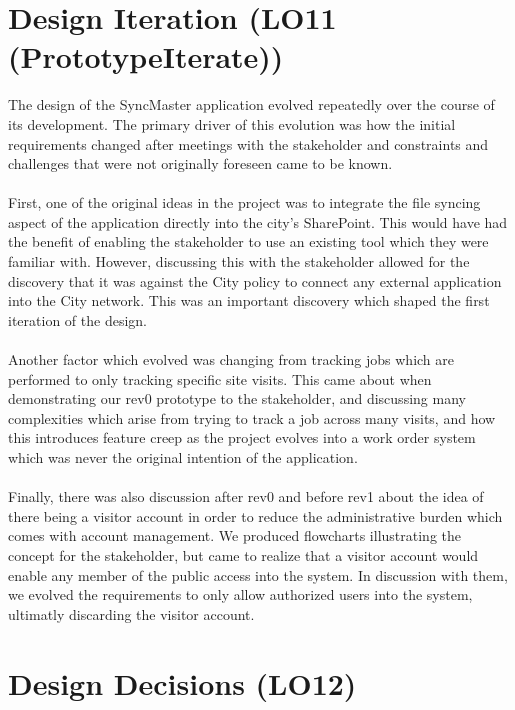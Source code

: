 \documentclass{article}
\begin{document}
\section{Design Iteration (LO11 (PrototypeIterate))}

The design of the SyncMaster application evolved repeatedly over the course of its development.
The primary driver of this evolution was how the initial requirements changed after meetings with the stakeholder
and constraints and challenges that were not originally foreseen came to be known.\\
\\
First, one of the original ideas in the project was to integrate the file syncing aspect of the application directly into the city's
SharePoint. This would have had the benefit of enabling the stakeholder to use an existing tool which they were familiar with.
However, discussing this with the stakeholder allowed for the discovery that it was against the City policy to connect any
external application into the City network. This was an important discovery which shaped the first iteration of the design.\\
\\
Another factor which evolved was changing from tracking jobs which are performed to only tracking specific site visits. This
came about when demonstrating our rev0 prototype to the stakeholder, and discussing many complexities which arise from trying
to track a job across many visits, and how this introduces feature creep as the project evolves into a work order system which
was never the original intention of the application.\\
\\
Finally, there was also discussion after rev0 and before rev1 about the idea of there being a visitor account in order to
reduce the administrative burden which comes with account management. We produced flowcharts illustrating the concept for the
stakeholder, but came to realize that a visitor account would enable any member of the public access into the system. In discussion
with them, we evolved the requirements to only allow authorized users into the system, ultimatly discarding the visitor account.

\section{Design Decisions (LO12)}
\end{document}
